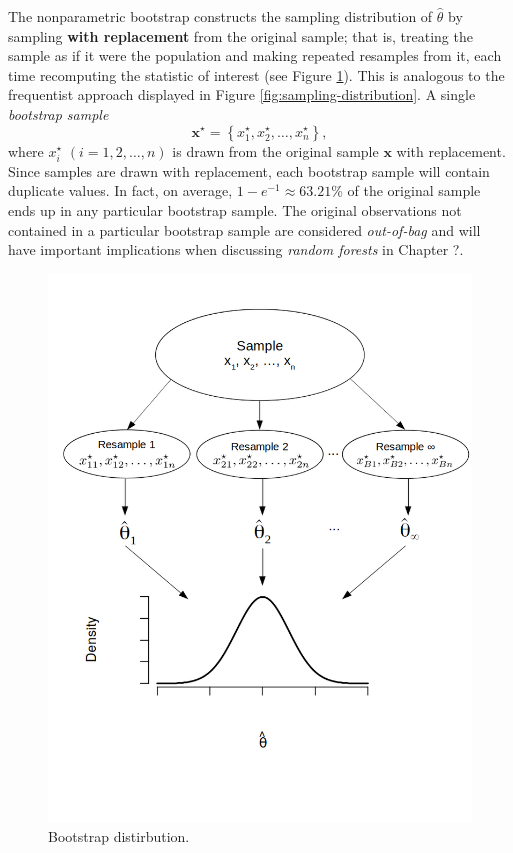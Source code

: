 \documentclass[]{book}
\theoremstyle{definition}
\theoremstyle{definition}
\theoremstyle{definition}
\theoremstyle{remark}
\begin{document}
The nonparametric bootstrap constructs the sampling distribution of
\(\widehat{\theta}\) by sampling \textbf{with replacement} from the
original sample; that is, treating the sample as if it were the
population and making repeated resamples from it, each time recomputing
the statistic of interest (see Figure \ref{fig:bootstrap-distribution}).
This is analogous to the frequentist approach displayed in Figure
\ref{fig:sampling-distribution}. A single \emph{bootstrap sample} \[
  \boldsymbol{x} ^ \star = \left\{x_1 ^ \star, x_2 ^ \star, \dots, x_n ^ \star\right\},
\] where \(x_i ^ \star\) \(\left(i = 1, 2, \dots, n\right)\) is drawn
from the original sample \(\boldsymbol{x}\) with replacement. Since
samples are drawn with replacement, each bootstrap sample will contain
duplicate values. In fact, on average, \(1 - e ^ {-1} \approx 63.21\)\%
of the original sample ends up in any particular bootstrap sample. The
original observations not contained in a particular bootstrap sample are
considered \emph{out-of-bag} and will have important implications when
discussing \emph{random forests} in Chapter ?.

\begin{figure}

{\centering \includegraphics[width=1\linewidth]{illustrations/bootstrap-distribution} 

}

\caption{Bootstrap distirbution.}\label{fig:bootstrap-distribution}
\end{figure}
\end{document}
